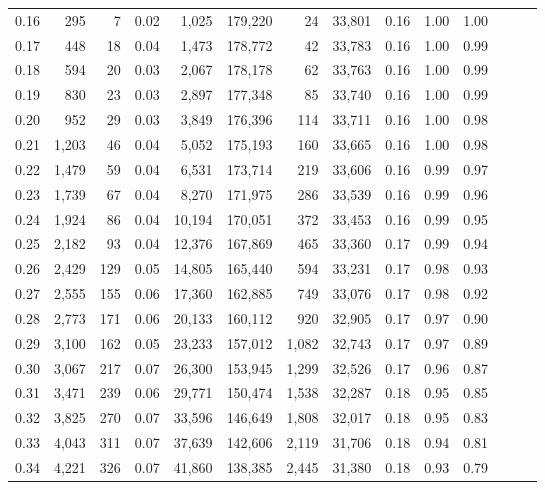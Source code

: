 \begin{tabular}{rrrrrrrrrrrrrr}
0.16 &    295 &      7 &  0.02 &    1,025 &  179,220 &      24 &  33,801 &  0.16 &  1.00 &      1.00 \\
0.17 &    448 &     18 &  0.04 &    1,473 &  178,772 &      42 &  33,783 &  0.16 &  1.00 &      0.99 \\
0.18 &    594 &     20 &  0.03 &    2,067 &  178,178 &      62 &  33,763 &  0.16 &  1.00 &      0.99 \\
0.19 &    830 &     23 &  0.03 &    2,897 &  177,348 &      85 &  33,740 &  0.16 &  1.00 &      0.99 \\
0.20 &    952 &     29 &  0.03 &    3,849 &  176,396 &     114 &  33,711 &  0.16 &  1.00 &      0.98 \\
0.21 &  1,203 &     46 &  0.04 &    5,052 &  175,193 &     160 &  33,665 &  0.16 &  1.00 &      0.98 \\
0.22 &  1,479 &     59 &  0.04 &    6,531 &  173,714 &     219 &  33,606 &  0.16 &  0.99 &      0.97 \\
0.23 &  1,739 &     67 &  0.04 &    8,270 &  171,975 &     286 &  33,539 &  0.16 &  0.99 &      0.96 \\
0.24 &  1,924 &     86 &  0.04 &   10,194 &  170,051 &     372 &  33,453 &  0.16 &  0.99 &      0.95 \\
0.25 &  2,182 &     93 &  0.04 &   12,376 &  167,869 &     465 &  33,360 &  0.17 &  0.99 &      0.94 \\
0.26 &  2,429 &    129 &  0.05 &   14,805 &  165,440 &     594 &  33,231 &  0.17 &  0.98 &      0.93 \\
0.27 &  2,555 &    155 &  0.06 &   17,360 &  162,885 &     749 &  33,076 &  0.17 &  0.98 &      0.92 \\
0.28 &  2,773 &    171 &  0.06 &   20,133 &  160,112 &     920 &  32,905 &  0.17 &  0.97 &      0.90 \\
0.29 &  3,100 &    162 &  0.05 &   23,233 &  157,012 &   1,082 &  32,743 &  0.17 &  0.97 &      0.89 \\
0.30 &  3,067 &    217 &  0.07 &   26,300 &  153,945 &   1,299 &  32,526 &  0.17 &  0.96 &      0.87 \\
0.31 &  3,471 &    239 &  0.06 &   29,771 &  150,474 &   1,538 &  32,287 &  0.18 &  0.95 &      0.85 \\
0.32 &  3,825 &    270 &  0.07 &   33,596 &  146,649 &   1,808 &  32,017 &  0.18 &  0.95 &      0.83 \\
0.33 &  4,043 &    311 &  0.07 &   37,639 &  142,606 &   2,119 &  31,706 &  0.18 &  0.94 &      0.81 \\
0.34 &  4,221 &    326 &  0.07 &   41,860 &  138,385 &   2,445 &  31,380 &  0.18 &  0.93 &      0.79 \\

\end{tabular}
